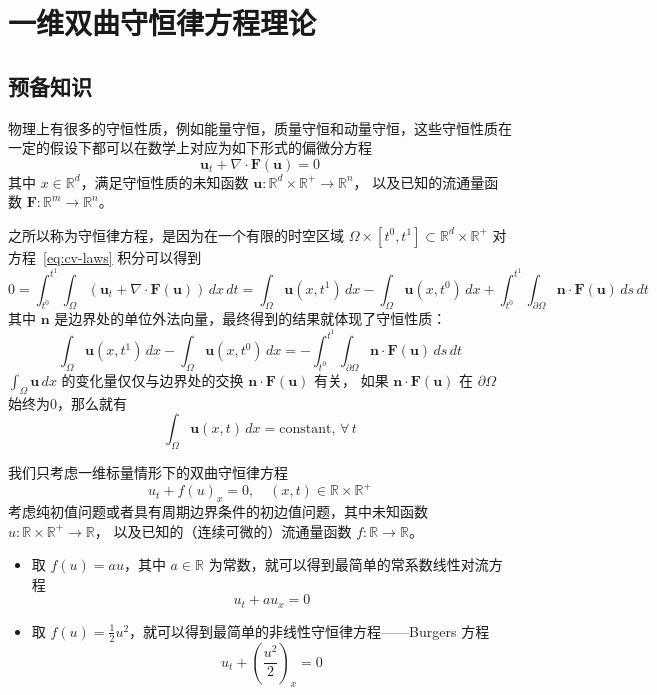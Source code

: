 \chapter{一维双曲守恒律方程理论}

\section{预备知识}

物理上有很多的守恒性质，例如能量守恒，质量守恒和动量守恒，这些守恒性质在一定的假设下都可以在数学上对应为如下形式的偏微分方程
\begin{equation}
    \bm{u}_t + \nabla \cdot \bm{F}(\bm{u}) = 0
    \label{eq:cv-laws}
\end{equation}
其中 $x \in \mathbb{R}^d$，满足守恒性质的未知函数 $\bm{u}: \mathbb{R}^d \times \mathbb{R}^+ \to \mathbb{R}^n$，
以及已知的流通量函数 $\bm{F}:\mathbb{R}^m \to \mathbb{R}^n$。

之所以称为守恒律方程，是因为在一个有限的时空区域 $\Omega \times [t^0,t^1] \subset \mathbb{R}^d \times  \mathbb{R}^+$ 对方程~\eqref{eq:cv-laws} 积分可以得到
\[
    0 = \int_{t^0}^{t^1} \int_{\Omega} \left(\bm{u}_t + \nabla \cdot \bm{F}(\bm{u})\right) \,dx\,dt
    = \int_{\Omega} \bm{u}(x,t^1)\,dx - \int_{\Omega} \bm{u}(x,t^0)\,dx
    + \int_{t^0}^{t^1} \int_{\partial \Omega} \bm{n} \cdot \bm{F}(\bm{u}) \,ds\,dt
\]
其中 $\bm{n}$ 是边界处的单位外法向量，最终得到的结果就体现了守恒性质：
\[
    \int_{\Omega} \bm{u}(x,t^1)\,dx - \int_{\Omega} \bm{u}(x,t^0)\,dx
    = - \int_{t^0}^{t^1}\int_{\partial \Omega} \bm{n} \cdot \bm{F}(\bm{u}) \,ds\,dt
\]
$\int_{\Omega} \bm{u}\,dx$ 的变化量仅仅与边界处的交换 $\bm{n} \cdot \bm{F}(\bm{u})$ 有关，
如果 $\bm{n} \cdot \bm{F}(\bm{u})$ 在 $\partial \Omega$ 始终为0，那么就有
\[
    \int_{\Omega} \bm{u}(x,t)\,dx = \text{constant},\,\forall\, t
\]

我们只考虑一维标量情形下的双曲守恒律方程
\begin{equation}
    u_t + f(u)_x = 0,\quad (x,t) \in \mathbb{R} \times  \mathbb{R}^+
    \label{eq:cv-law-scalar}
\end{equation}
考虑纯初值问题或者具有周期边界条件的初边值问题，其中未知函数 $u: \mathbb{R} \times  \mathbb{R}^+ \to \mathbb{R}$，
以及已知的（连续可微的）流通量函数 $f:\mathbb{R} \to \mathbb{R}$。

\begin{example}
    \noindent
    \begin{itemize}
        \item 取 $f(u) = a u$，其中 $a \in \mathbb{R}$ 为常数，就可以得到最简单的常系数线性对流方程
              \[
                  u_t + a u_x = 0
              \]
        \item 取 $f(u) = \frac12 u^2$，就可以得到最简单的非线性守恒律方程——Burgers 方程
              \[
                  u_t + \left(\frac{u^2}2\right)_x = 0
              \]
    \end{itemize}
\end{example}

